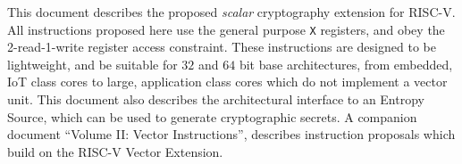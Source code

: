 
This document describes the proposed {\em scalar} cryptography
extension for RISC-V.
All instructions proposed here use the general purpose {\tt X}
registers, and obey the 2-read-1-write register access constraint.
These instructions are designed to be lightweight, and be suitable
for $32$ and $64$ bit base architectures, from embedded, IoT class
cores to large, application class cores which do not implement a
vector unit.
This document also describes the architectural interface to an
Entropy Source, which can be used to generate cryptographic secrets.
A companion document ``Volume II: Vector Instructions'', describes
instruction proposals which build on the RISC-V Vector Extension.

